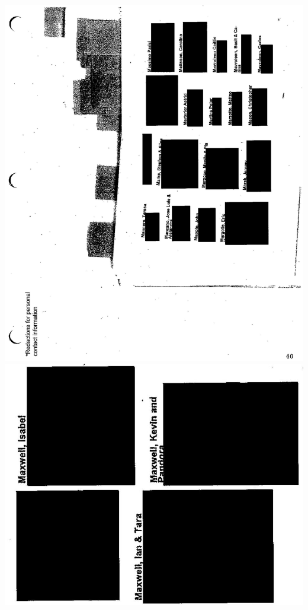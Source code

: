 \documentclass[10pt]{article}
\begin{document}
\includegraphics[max width=\textwidth, center]{2025_02_27_dd68c3d38de88f0516d9g-157}\\
\includegraphics[max width=\textwidth, center]{2025_02_27_dd68c3d38de88f0516d9g-158(1)}\\
\end{document}
